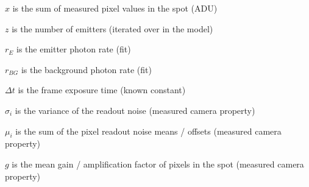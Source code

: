 $x$ is the sum of measured pixel values in the spot (ADU)

$z$ is the number of emitters (iterated over in the model)

$r_{E}$ is the emitter photon rate (fit)

$r_{BG}$ is the background photon rate (fit)

$\Delta t$ is the frame exposure time (known constant)

$\sigma_{i}$ is the variance of the readout noise (measured camera property)

$\mu_{i}$ is the sum of the pixel readout noise means / offsets (measured camera property)

$g$ is the mean gain / amplification factor of pixels in the spot (measured camera property)







